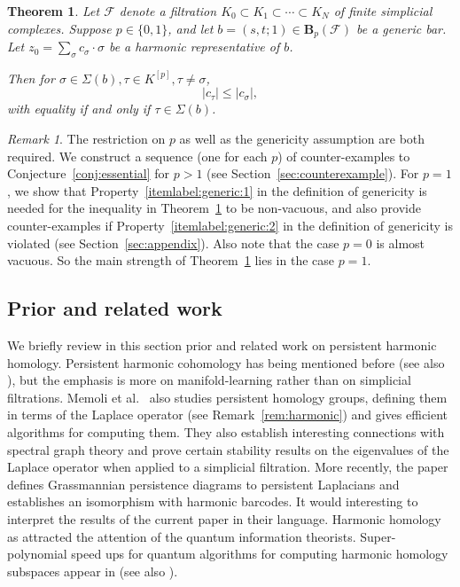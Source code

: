 \documentclass[11pt]{amsart}
\theoremstyle{theorem}
\newtheorem{theorem}{Theorem}
\theoremstyle{remark}
\newtheorem{remark}{Remark}[section]
\theoremstyle{definition}
\newcommand{\hide}[1]{}
\begin{document}
\begin{theorem}
\label{thm:main}
Let $\mathcal{F}$ denote a filtration $K_0 \subset K_1 \subset \cdots \subset K_N$ of finite simplicial complexes.  Suppose $p \in \{0,1\}$, and  
let $b = (s,t;1) \in \mathbf{B}_p(\mathcal{F})$ be a generic bar.
Let $z_0 = \sum_{\sigma} c_\sigma\cdot \sigma$
be a harmonic representative of $b$. 
\hide{
Then for $\sigma \in \Sigma(b), \tau \in K^{[p]}\setminus\Sigma(b)$,
\[
|c_\tau| < |c_\sigma|.
\]
}
Then for $\sigma \in \Sigma(b), \tau \in K^{[p]}, \tau \neq \sigma$,
\[
|c_\tau| \leq |c_\sigma|,
\]
with equality if and only if $\tau \in \Sigma(b)$.
\end{theorem}

\begin{remark}
\label{rem:restrictions}
    The restriction on $p$ as well as
    the genericity assumption are both required.
    We construct a sequence (one for each $p$) of counter-examples to Conjecture~\ref{conj:essential} for $p>1$ (see Section~\ref{sec:counterexample}). For $p=1$, we
    show that Property~\eqref{itemlabel:generic:1} in the definition of genericity is needed for the inequality
    in Theorem~\ref{thm:main} to be non-vacuous,
     and also provide counter-examples if Property~\eqref{itemlabel:generic:2} in the definition of genericity is violated (see Section~\ref{sec:appendix}).
     Also note that the case $p=0$ is almost vacuous. So the main strength of Theorem~\ref{thm:main} lies in the case $p=1$.
\end{remark}

\subsection{Prior and related work}
We briefly review in this section prior and related work on persistent harmonic homology.
Persistent harmonic cohomology has being mentioned before \cite{talk:Lieutier} (see also \cite{Chen-et-al-2021}),
but the 
emphasis is more on manifold-learning rather than on simplicial filtrations. Memoli et al.\  \cite{Memoli-et-al} also studies persistent homology groups,
defining them in terms of the Laplace operator (see Remark~\ref{rem:harmonic}) 
and gives efficient
algorithms for computing them. They also establish interesting connections with spectral graph theory and
prove certain stability results on the eigenvalues of the Laplace operator when applied to a simplicial
filtration.
More recently, the paper \cite{gulen2025grassmannianpersistencediagramsspecial} defines  Grassmannian persistence diagrams to persistent Laplacians and establishes an isomorphism with harmonic barcodes. It would interesting to interpret the results of the current paper in their language. 
Harmonic homology as attracted the attention of the quantum information theorists. 
Super-polynomial speed ups for quantum algorithms for computing harmonic homology subspaces appear in \cite{Hayakawa-et-al-2026} (see also \cite{gyurik-et-al}). 
\end{document}

